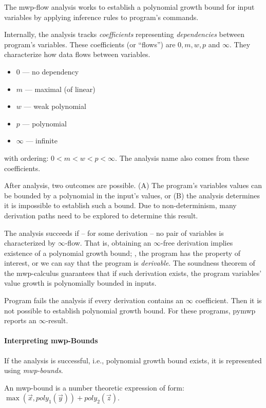 The mwp-flow analysis works to establish a polynomial growth bound for input variables by applying inference rules to program's commands.

Internally, the analysis tracks \emph{coefficients} representing \emph{dependencies} between program's variables.
These coefficients (or ``flows'') are \(0, m, w, p\) and \(\infty\).
They characterize how data flows between variables.

\begin{itemize}
    \item \(0\) --- no dependency
    \item \(m\) --- maximal (of linear)
    \item \(w\) --- weak polynomial
    \item \(p\) --- polynomial
    \item \(\infty\) --- infinite
\end{itemize}

with ordering: \(0 < m < w < p < \infty\).
The analysis name also comes from these coefficients.

After analysis, two outcomes are possible.
(A) The program's variables values can be bounded by a polynomial in the input's values, or (B) the analysis determines it is impossible to establish such a bound.
Due to non-determinism, many derivation paths need to be explored to determine this result.

The analysis succeeds if -- for some derivation -- no pair of variables is characterized by \(\infty\)-flow.
That is, obtaining an \(\infty\)-free derivation implies existence of a polynomial growth bound;
\ie, the program has the property of interest, or we can say that the program is \emph{derivable}.
The soundness theorem of the mwp-calculus guarantees that if such derivation exists, the program variables' value growth is polynomially bounded in inputs.

Program fails the analysis if every derivation contains an \(\infty\) coefficient.
Then it is not possible to establish polynomial growth bound.
For these programs, pymwp reports an \(\infty\)-result.

\paragraph{Interpreting mwp-Bounds}

If the analysis is successful, i.e., polynomial growth bound exists, it is represented using \emph{mwp-bounds}.

An mwp-bound is a number theoretic expression of form: \(\max(\vec x, poly_1(\vec y)) + poly_2(\vec z)\).

